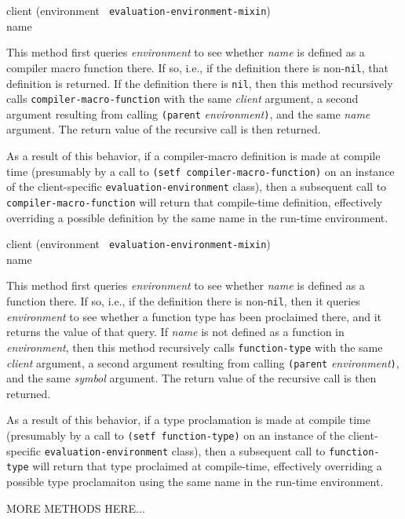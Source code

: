 {\small{} {client (environment {\tt
      evaluation-environment-mixin}) \\ name}
}

This method first queries \textit{environment} to see whether
\textit{name} is defined as a compiler macro function there.  If so,
i.e., if the definition there is non-\texttt{nil}, that definition is
returned.  If the definition there is \texttt{nil}, then this method
recursively calls \texttt{compiler-macro-function} with the same
\textit{client} argument, a second argument resulting from calling
\texttt{(parent} \textit{environment}\texttt{)}, and the same
\textit{name} argument.  The return value of the recursive call is
then returned.

As a result of this behavior, if a compiler-macro definition is made
at compile time (presumably by a call to \texttt{(setf
  compiler-macro-function)} on an instance of the client-specific
\texttt{evaluation-environment} class), then a subsequent call to
\texttt{compiler-macro-function} will return that compile-time
definition, effectively overriding a possible definition by the same
name in the run-time environment.

{\small{} {client (environment {\tt
      evaluation-environment-mixin}) \\ name}
}

This method first queries \textit{environment} to see whether
\textit{name} is defined as a function there.  If so, i.e., if the
definition there is non-\texttt{nil}, then it queries
\textit{environment} to see whether a function type has been
proclaimed there, and it returns the value of that query.  If
\textit{name} is not defined as a function in \textit{environment},
then this method recursively calls \texttt{function-type} with the
same \textit{client} argument, a second argument resulting from
calling \texttt{(parent} \textit{environment}\texttt{)}, and the same
\textit{symbol} argument.  The return value of the recursive call is
then returned.

As a result of this behavior, if a type proclamation is made at
compile time (presumably by a call to \texttt{(setf function-type)} on
an instance of the client-specific \texttt{evaluation-environment}
class), then a subsequent call to \texttt{function-type} will return
that type proclaimed at compile-time, effectively overriding a
possible type proclamaiton using the same name in the run-time
environment.

MORE METHODS HERE...
